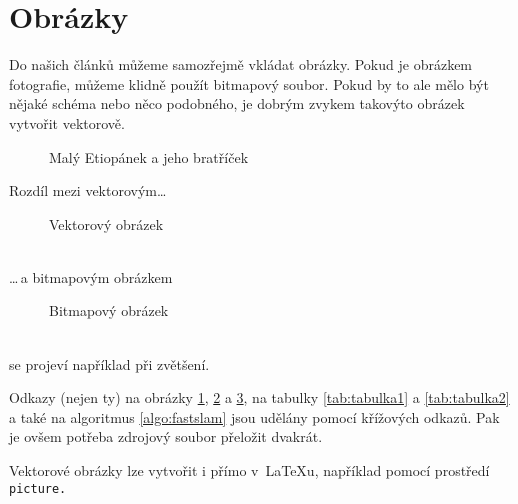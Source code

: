 \documentclass[hidelinks, 11pt, a4paper]{article}
\begin{document}
\section{Obrázky}
Do našich článků můžeme samozřejmě vkládat obrázky. Pokud je obrázkem fotografie,
můžeme klidně použít bitmapový soubor. Pokud by to ale mělo být nějaké schéma nebo
něco podobného, je dobrým zvykem takovýto obrázek vytvořit vektorově.
\begin{figure}[ht]
    \centering
    \caption{Malý Etiopánek a jeho bratříček}
    \label{fig:obrazek1}    
\end{figure}
\bigskip
\newpage
Rozdíl mezi vektorovým\dots
\begin{figure}[ht]
    \centering
    \caption{Vektorový obrázek}
    \label{fig:obrazek2}
\end{figure}\bigskip\\
\dots\,a bitmapovým obrázkem
\begin{figure}[ht]
    \centering
    \caption{Bitmapový obrázek}
    \label{fig:obrazek3}
\end{figure}\bigskip\\
se projeví například při zvětšení.

Odkazy (nejen ty) na obrázky \ref{fig:obrazek1}, \ref{fig:obrazek2} a \ref{fig:obrazek3}, na tabulky \ref{tab:tabulka1} a \ref{tab:tabulka2} a také na algoritmus \ref{algo:fastslam} jsou udělány pomocí křížových odkazů. Pak je ovšem potřeba zdrojový soubor přeložit dvakrát.

Vektorové obrázky lze vytvořit i přímo v~\LaTeX u, například pomocí prostředí\texttt{ picture.}
\end{document}
